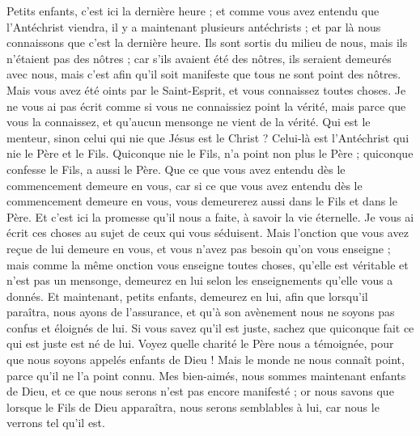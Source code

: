 \begin{multicols}{2}
Petits enfants, c'est ici la dernière heure ; et comme vous avez entendu que l'Antéchrist viendra, il y a maintenant plusieurs antéchrists ; et par là nous connaissons que c'est la dernière heure.
Ils sont sortis du milieu de nous, mais ils n'étaient pas des nôtres ; car s'ils avaient été des nôtres, ils seraient demeurés avec nous, mais c'est afin qu'il soit manifeste que tous ne sont point des nôtres.
Mais vous avez été oints par le Saint-Esprit, et vous connaissez toutes choses.
Je ne vous ai pas écrit comme si vous ne connaissiez point la vérité, mais parce que vous la connaissez, et qu'aucun mensonge ne vient de la vérité.
Qui est le menteur, sinon celui qui nie que Jésus est le Christ ? Celui-là est l'Antéchrist qui nie le Père et le Fils.
Quiconque nie le Fils, n'a point non plus le Père ; quiconque confesse le Fils, a aussi le Père.
Que ce que vous avez entendu dès le commencement demeure en vous, car si ce que vous avez entendu dès le commencement demeure en vous, vous demeurerez aussi dans le Fils et dans le Père.
Et c'est ici la promesse qu'il nous a faite, à savoir la vie éternelle.
Je vous ai écrit ces choses au sujet de ceux qui vous séduisent.
Mais l'onction que vous avez reçue de lui demeure en vous, et vous n'avez pas besoin qu'on vous enseigne ; mais comme la même onction vous enseigne toutes choses, qu'elle est véritable et n'est pas un mensonge, demeurez en lui selon les enseignements qu’elle vous a donnés.
Et maintenant, petits enfants, demeurez en lui, afin que lorsqu’il paraîtra, nous ayons de l’assurance, et qu’à son avènement nous ne soyons pas confus et éloignés de lui.
Si vous savez qu'il est juste, sachez que quiconque fait ce qui est juste est né de lui.
\VerseOne{}Voyez quelle charité le Père nous a témoignée, pour que nous soyons appelés enfants de Dieu ! Mais le monde ne nous connaît point, parce qu'il ne l'a point connu.
Mes bien-aimés, nous sommes maintenant enfants de Dieu, et ce que nous serons n'est pas encore manifesté ; or nous savons que lorsque le Fils de Dieu apparaîtra, nous serons semblables à lui, car nous le verrons tel qu'il est.

\end{multicols}
